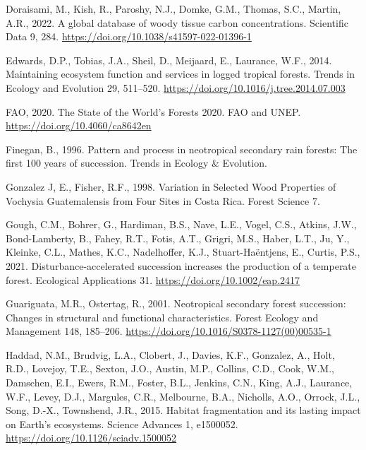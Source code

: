 \documentclass[
  12pt,
]{article}
\newlength{\cslhangindent}
\newlength{\cslentryspacingunit} %
\newenvironment{CSLReferences}[2] %
 {%
  \setlength{\parindent}{0pt}
  \ifodd #1
  \let\oldpar\par
  \def\par{\hangindent=\cslhangindent\oldpar}
  \fi
  \setlength{\parskip}{#2\cslentryspacingunit}
 }%
 {}
\begin{document}
\begin{CSLReferences}{1}{0}
\leavevmode{}%
Doraisami, M., Kish, R., Paroshy, N.J., Domke, G.M., Thomas, S.C., Martin, A.R., 2022. A global database of woody tissue carbon concentrations. Scientific Data 9, 284. \url{https://doi.org/10.1038/s41597-022-01396-1}

\leavevmode{}%
Edwards, D.P., Tobias, J.A., Sheil, D., Meijaard, E., Laurance, W.F., 2014. Maintaining ecosystem function and services in logged tropical forests. Trends in Ecology and Evolution 29, 511--520. \url{https://doi.org/10.1016/j.tree.2014.07.003}

\leavevmode{}%
FAO, 2020. The {State} of the {World}'s {Forests} 2020. {FAO and UNEP}. \url{https://doi.org/10.4060/ca8642en}

\leavevmode{}%
Finegan, B., 1996. Pattern and process in neotropical secondary rain forests: The first 100 years of succession. Trends in Ecology \& Evolution.

\leavevmode{}%
Gonzalez J, E., Fisher, R.F., 1998. Variation in {Selected Wood Properties} of {Vochysia Guatemalensis} from {Four Sites} in {Costa Rica}. Forest Science 7.

\leavevmode{}%
Gough, C.M., Bohrer, G., Hardiman, B.S., Nave, L.E., Vogel, C.S., Atkins, J.W., Bond-Lamberty, B., Fahey, R.T., Fotis, A.T., Grigri, M.S., Haber, L.T., Ju, Y., Kleinke, C.L., Mathes, K.C., Nadelhoffer, K.J., Stuart-Haëntjens, E., Curtis, P.S., 2021. Disturbance-accelerated succession increases the production of a temperate forest. Ecological Applications 31. \url{https://doi.org/10.1002/eap.2417}

\leavevmode{}%
Guariguata, M.R., Ostertag, R., 2001. Neotropical secondary forest succession: {Changes} in structural and functional characteristics. Forest Ecology and Management 148, 185--206. \url{https://doi.org/10.1016/S0378-1127(00)00535-1}

\leavevmode{}%
Haddad, N.M., Brudvig, L.A., Clobert, J., Davies, K.F., Gonzalez, A., Holt, R.D., Lovejoy, T.E., Sexton, J.O., Austin, M.P., Collins, C.D., Cook, W.M., Damschen, E.I., Ewers, R.M., Foster, B.L., Jenkins, C.N., King, A.J., Laurance, W.F., Levey, D.J., Margules, C.R., Melbourne, B.A., Nicholls, A.O., Orrock, J.L., Song, D.-X., Townshend, J.R., 2015. Habitat fragmentation and its lasting impact on {Earth}'s ecosystems. Science Advances 1, e1500052. \url{https://doi.org/10.1126/sciadv.1500052}


\end{CSLReferences}
\end{document}

